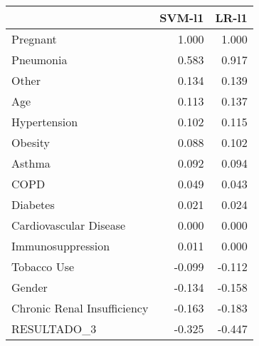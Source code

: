 \begin{tabular}{lrr}
\toprule
{} &  SVM-l1 &  LR-l1 \\
\midrule
Pregnant                    &   1.000 &  1.000 \\
Pneumonia                   &   0.583 &  0.917 \\
Other                       &   0.134 &  0.139 \\
Age                         &   0.113 &  0.137 \\
Hypertension                &   0.102 &  0.115 \\
Obesity                     &   0.088 &  0.102 \\
Asthma                      &   0.092 &  0.094 \\
COPD                        &   0.049 &  0.043 \\
Diabetes                    &   0.021 &  0.024 \\
Cardiovascular Disease      &   0.000 &  0.000 \\
Immunosuppression           &   0.011 &  0.000 \\
Tobacco Use                 &  -0.099 & -0.112 \\
Gender                      &  -0.134 & -0.158 \\
Chronic Renal Insufficiency &  -0.163 & -0.183 \\
RESULTADO\_3                 &  -0.325 & -0.447 \\
\bottomrule
\end{tabular}
